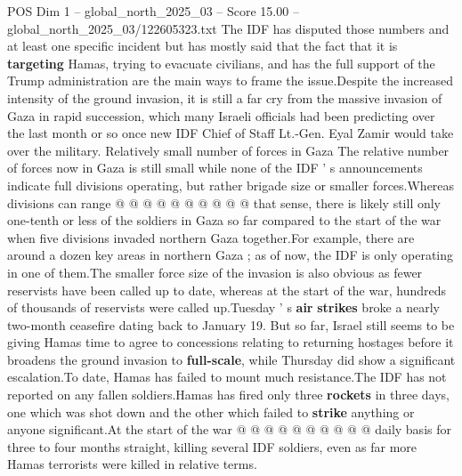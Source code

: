 \begin{textsample}{POS Dim 1 – global\_north\_2025\_03 – Score 15.00 – global\_north\_2025\_03/122605323.txt}
The IDF has disputed those numbers and at least one specific incident but has mostly said that the fact that it is \textbf{targeting} Hamas, trying to evacuate civilians, and has the full support of the Trump administration are the main ways to frame the issue.Despite the increased intensity of the ground invasion, it is still a far cry from the massive invasion of Gaza in rapid succession, which many Israeli officials had been predicting over the last month or so once new IDF Chief of Staff Lt.-Gen.
Eyal Zamir would take over the military.
Relatively small number of forces in Gaza The relative number of forces now in Gaza is still small while none of the IDF ' s announcements indicate full divisions operating, but rather brigade size or smaller forces.Whereas divisions can range @ @ @ @ @ @ @ @ @ @ that sense, there is likely still only one-tenth or less of the soldiers in Gaza so far compared to the start of the war when five divisions invaded northern Gaza together.For example, there are around a dozen key areas in northern Gaza ; as of now, the IDF is only operating in one of them.The smaller force size of the invasion is also obvious as fewer reservists have been called up to date, whereas at the start of the war, hundreds of thousands of reservists were called up.Tuesday ' s \textbf{air} \textbf{strikes} broke a nearly two-month ceasefire dating back to January 19.
But so far, Israel still seems to be giving Hamas time to agree to concessions relating to returning hostages before it broadens the ground invasion to \textbf{full-scale}, while Thursday did show a significant escalation.To date, Hamas has failed to mount much resistance.The IDF has not reported on any fallen soldiers.Hamas has fired only three \textbf{rockets} in three days, one which was shot down and the other which failed to \textbf{strike} anything or anyone significant.At the start of the war @ @ @ @ @ @ @ @ @ @ daily basis for three to four months straight, killing several IDF soldiers, even as far more Hamas terrorists were killed in relative terms.

\end{textsample}
